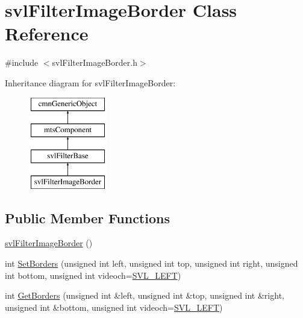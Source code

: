 \hypertarget{classsvl_filter_image_border}{}\section{svl\+Filter\+Image\+Border Class Reference}
\label{classsvl_filter_image_border}


{\ttfamily \#include $<$svl\+Filter\+Image\+Border.\+h$>$}

Inheritance diagram for svl\+Filter\+Image\+Border\+:\begin{figure}[H]
\begin{center}
\leavevmode
\includegraphics[height=4.000000cm]{d8/d80/classsvl_filter_image_border}
\end{center}
\end{figure}
\subsection*{Public Member Functions}
\begin{DoxyCompactItemize}
\item 
\hyperlink{classsvl_filter_image_border_ac3e25f1c2c6d097787dd26252fd31dc9}{svl\+Filter\+Image\+Border} ()
\item 
int \hyperlink{classsvl_filter_image_border_a849e9326120136f86a5eb2aa21a902bb}{Set\+Borders} (unsigned int left, unsigned int top, unsigned int right, unsigned int bottom, unsigned int videoch=\hyperlink{svl_definitions_8h_ab9fec7615f19c8df2919eebcab0b187f}{S\+V\+L\+\_\+\+L\+E\+F\+T})
\item 
int \hyperlink{classsvl_filter_image_border_af3fb67178868454fcc855c8fe9d31505}{Get\+Borders} (unsigned int \&left, unsigned int \&top, unsigned int \&right, unsigned int \&bottom, unsigned int videoch=\hyperlink{svl_definitions_8h_ab9fec7615f19c8df2919eebcab0b187f}{S\+V\+L\+\_\+\+L\+E\+F\+T})
\end{DoxyCompactItemize}
